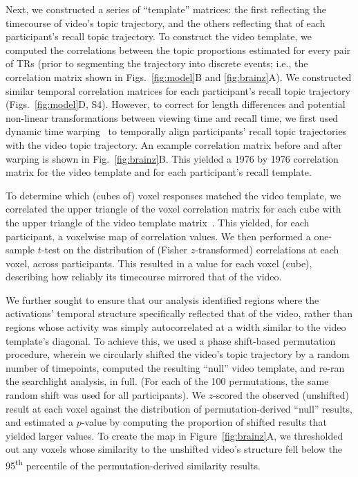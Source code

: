 \documentclass{article}
\newcommand{\corrmats}{S4}
\begin{document}
Next, we constructed a series of ``template'' matrices: the first reflecting the timecourse of video's topic trajectory, and the others reflecting that of each participant's recall topic trajectory.  To construct the video template, we computed the correlations between the topic proportions estimated for every pair of TRs (prior to segmenting the trajectory into discrete events; i.e., the correlation matrix shown in Figs.~\ref{fig:model}B and \ref{fig:brainz}A).  We constructed similar temporal correlation matrices for each participant's recall topic trajectory (Figs.~\ref{fig:model}D, \corrmats).  However, to correct for length differences and potential non-linear transformations between viewing time and recall time, we first used dynamic time warping~\citep{BernClif94} to temporally align participants' recall topic trajectories with the video topic trajectory.  An example correlation matrix before and after warping is shown in Fig.~\ref{fig:brainz}B.  This yielded a 1976 by 1976 correlation matrix for the video template and for each participant's recall template.

To determine which (cubes of) voxel responses matched the video template, we correlated the upper triangle of the voxel correlation matrix for each cube with the upper triangle of the video template matrix~\citep{KrieEtal08b}.  This yielded, for each participant, a voxelwise map of correlation values.  We then performed a one-sample $t$-test on the distribution of (Fisher $z$-transformed) correlations at each voxel, across participants.  This resulted in a value for each voxel (cube), describing how reliably its timecourse mirrored that of the video.

We further sought to ensure that our analysis identified regions where the activations’ temporal structure specifically reflected that of the video, rather than regions whose activity was simply autocorrelated at a width similar to the video template’s diagonal.  To achieve this, we used a phase shift-based permutation procedure, wherein we circularly shifted the video’s topic trajectory by a random number of timepoints, computed the resulting ``null” video template, and re-ran the searchlight analysis, in full.  (For each of the 100 permutations, the same random shift was used for all participants).  We $z$-scored the observed (unshifted) result at each voxel against the distribution of permutation-derived ``null” results, and estimated a $p$-value by computing the proportion of shifted results that yielded larger values.  To create the map in Figure~\ref{fig:brainz}A, we thresholded out any voxels whose similarity to the unshifted video’s structure fell below the 95\textsuperscript{th} percentile of the permutation-derived similarity results.
\end{document}
